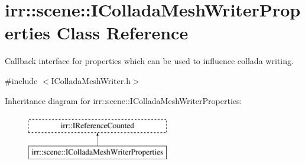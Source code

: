 \hypertarget{classirr_1_1scene_1_1IColladaMeshWriterProperties}{}\section{irr\+:\+:scene\+:\+:I\+Collada\+Mesh\+Writer\+Properties Class Reference}
\label{classirr_1_1scene_1_1IColladaMeshWriterProperties}


Callback interface for properties which can be used to influence collada writing.  




{\ttfamily \#include $<$I\+Collada\+Mesh\+Writer.\+h$>$}

Inheritance diagram for irr\+:\+:scene\+:\+:I\+Collada\+Mesh\+Writer\+Properties\+:\begin{figure}[H]
\begin{center}
\leavevmode
\includegraphics[height=2.000000cm]{classirr_1_1scene_1_1IColladaMeshWriterProperties}
\end{center}
\end{figure}
